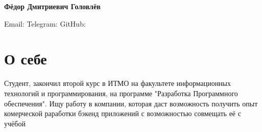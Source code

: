 \documentclass[letterpaper,10pt]{article}
\makeatletter
\newcommand{\tframed}[2][]{\tikz[baseline=(h.base)]\node[rndblock,#1] (h) {\color{black}{#2}};}
\newcommand*{\mystrut}{\rule[-0.2\baselineskip]{0pt}{0.8\baselineskip}}
\newcommand{\skill}[1]{\tframed[lightgray]{\mystrut#1}}
\newcommand{\resumeExpSubheading}[5]{
  \vspace{3pt}
  \item
    \begin{tabular*}{0.97\textwidth}{l@{\extracolsep{\fill}}r}
      \vspace{2pt} \textbf{#1}  & \textcolor{mygray}{\small #2} \\
      \textit{#3} & \textcolor{mygray}{\textit{\small #4}} \\
      {\scriptsize#5}
    \end{tabular*}\vspace{3pt}
}
\newcommand{\resumeSubHeadingListStart}{\begin{itemize}[leftmargin=*]}
\newcommand{\resumeSubHeadingListEnd}{\end{itemize}}
\newcommand{\resumeDesc}[1]{\begin{adjustwidth}{5pt}{0pt}\vspace{-2pt}{#1}\end{adjustwidth}}
\newcommand{\ExternalLink}{
    \tikz[x=1.2ex, y=1.2ex, baseline=-0.05ex]{
        \begin{scope}[x=1ex, y=1ex]
            \clip (-0.1,-0.1) 
                --++ (-0, 1.2) 
                --++ (0.6, 0) 
                --++ (0, -0.6) 
                --++ (0.6, 0) 
                --++ (0, -1);
            \path[draw, 
                line width = 0.5, 
                rounded corners=0.5] 
                (0,0) rectangle (1,1);
        \end{scope}
        \path[draw, line width = 0.5] (0.5, 0.5) 
            -- (1, 1);
        \path[draw, line width = 0.5] (0.6, 1) 
            -- (1, 1) -- (1, 0.6);
        }
    }
\newcommand{\MYhref}[3][Blue1]{\href{#2}{\color{#1}{#3}}}
\makeatother
\begin{document}

\begin{center}\textbf{\Large Фёдор Дмитриевич Головлёв}\end{center}
\vspace{-12pt}
\begin{center}
Email: \MYhref{mailto:fdgolovlev@gmail.com}{fdgolovlev@gmail.com} \quad
Telegram: \MYhref{https://t.me/Erruano}{Erruano} \quad
GitHub: \MYhref{https://github.com/Eruano-prog}{Eruano-prog}
\end{center}

\vspace{-10pt}
\section{О себе}
\resumeSubHeadingListStart
\justifying
Студент, закончил второй курс в ИТМО на факультете информационных технологий и программирования, на программе "Разработка Программного обеспечения". Ищу работу в компании, которая даст возможность получить опыт комерческой раработки бэкенд приложений с возможностью совмещать её с учёбой
\resumeSubHeadingListEnd

      
\end{document}
